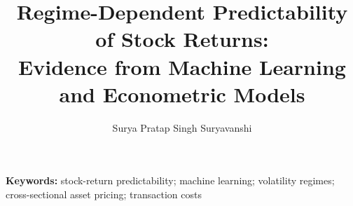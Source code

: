 \documentclass[10pt,letterpaper]{article}
\title{Regime-Dependent Predictability of Stock Returns:\\
Evidence from Machine Learning and Econometric Models}
\author{Surya Pratap Singh Suryavanshi}
\date{}
\newcommand{\keywords}[1]{%
  \par\noindent\textbf{Keywords:} #1\par\vspace{0.6\baselineskip}%
}
\begin{document}
\maketitle


\keywords{stock-return predictability; machine learning; volatility regimes;
  cross-sectional asset pricing; transaction costs}









\appendix




\end{document}
